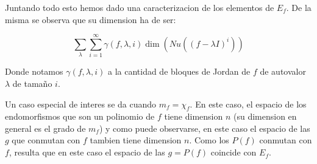 \documentclass{article}
\begin{document}
Juntando todo esto hemos dado una caracterizacion de los elementos de $E_f$. De la misma se observa que su
dimension ha de ser:

$$\sum_{\lambda}{\sum_{i=1}^{\infty}{\gamma(f,\lambda,i) \dim \left ( Nu((f-\lambda I)^i) \right )}}$$

Donde notamos $\gamma(f,\lambda,i)$ a la cantidad de bloques de Jordan de $f$ de autovalor $\lambda$ de tamaño $i$.

Un caso especial de interes se da cuando $m_f = \chi_f$. En este caso, el espacio de los endomorfismos que son
un polinomio de $f$ tiene dimension $n$ (su dimension en general es el grado de $m_f$) y como puede observarse,
en este caso el espacio de las $g$ que conmutan con $f$ tambien tiene dimension $n$. Como los $P(f)$ conmutan
con $f$, resulta que en este caso el espacio de las $g=P(f)$ coincide con $E_f$.
\end{document}
